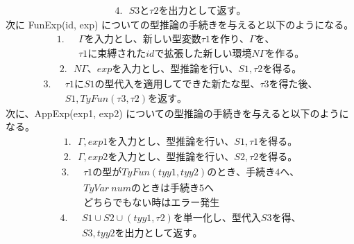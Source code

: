 \documentclass{jreport}
\begin{document}
\begin{equation}
  \begin{split}
    4. \ \ \ S3 と \tau2 を出力として返す。
  \end{split}
\end{equation}
次に FunExp(id, exp) についての型推論の手続きを与えると以下のようになる。
\begin{equation}
  \begin{split}
    1. \ \ \ &\Gamma　を入力とし、新しい型変数 \tau1 を作り、\Gamma を、\\ &
     \tau1 に束縛された id で拡張した新しい環境 N\Gamma を作る。
  \end{split}
\end{equation}
\begin{equation}
  \begin{split}
    2. \ \ \ N\Gamma 、exp を入力とし、型推論を行い、S1,　\tau2 を得る。
  \end{split}
\end{equation}
\begin{equation}
  \begin{split}
    3. \ \ \ &\tau1 にS1の型代入を適用してできた新たな型、\tau3 を得た後、\\ &
    S1, TyFun(\tau3, \tau2) を返す。
  \end{split}
\end{equation}
次に、AppExp(exp1, exp2) についての型推論の手続きを与えると以下のようになる。
\begin{equation}
  \begin{split}
    1. \ \ \ \Gamma, exp1 を入力とし、型推論を行い、S1,　\tau1 を得る。
  \end{split}
\end{equation}
\begin{equation}
  \begin{split}
    2. \ \ \ \Gamma, exp2 を入力とし、型推論を行い、S2, \tau2 を得る。
  \end{split}
\end{equation}
\begin{equation}
  \begin{split}
    3. \ \ \ &\tau1 の型が TyFun(tyy1, tyy2) のとき、手続き4へ、\\ & TyVar \ num  のときは手続き5へ　
    \\ &どちらでもない時はエラー発生
  \end{split}
\end{equation}
\begin{equation}
  \begin{split}
    4. \ \ \ &S1 \cup S2 \cup (tyy1, \tau2) を単一化し、型代入S3を得、\\ &
    S3, tyy2 を出力として返す。
  \end{split}
\end{equation}
\end{document}

